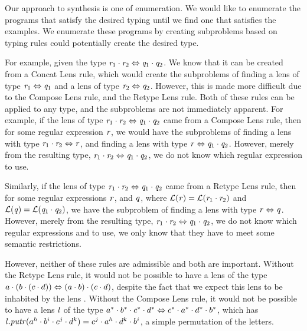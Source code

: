 Our approach to synthesis is one of enumeration.
We would like to enumerate the programs that satisfy the desired typing until
we find one that satisfies the examples.
We enumerate these programs by creating subproblems based on typing rules
could potentially create the desired type.

For example, given the type $\mathit{r}_1\cdot\mathit{r}_2\Leftrightarrow\mathit{q}_1\cdot\mathit{q}_2$.
We know that it can be created from a Concat Lens rule,
which would create the subproblems of finding a lens of type $\mathit{r}_1\Leftrightarrow\mathit{q}_1$
and a lens of type $\mathit{r}_2\Leftrightarrow\mathit{q}_2$.
However, this is made more difficult due to the Compose Lens rule,
and the Retype Lens rule.
Both of these rules can be applied to any type, and the subproblems are not immediately apparent.
For example, if the lens of type
$\mathit{r}_1\cdot\mathit{r}_2\Leftrightarrow\mathit{q}_1\cdot\mathit{q}_2$
came from a Compose Lens rule, then for some regular expression $\mathit{r}$,
we would have the subproblems of finding a lens with type
$\mathit{r}_1\cdot\mathit{r}_2\Leftrightarrow\mathit{r}$,
and finding a lens with type
$\mathit{r}\Leftrightarrow\mathit{q}_1\cdot\mathit{q}_2$.
However, merely from the resulting type,
$\mathit{r}_1\cdot\mathit{r}_2 \Leftrightarrow \mathit{q}_1\cdot\mathit{q}_2$,
we do not know which regular expression \Regex{} to use.

Similarly, if the lens of type
$\mathit{r}_1\cdot\mathit{r}_2\Leftrightarrow\mathit{q}_1\cdot\mathit{q}_2$
came from a Retype Lens rule, then for some regular expressions $\mathit{r}$, and $\mathit{q}$,
where $\mathcal{L}{}(\mathit{r})=\mathcal{L}{}(\mathit{r}_1\cdot\mathit{r}_2)$
and $\mathcal{L}{}(\mathit{q})=\mathcal{L}{}(\mathit{q}_1\cdot\mathit{q}_2)$,
we have the subproblem of finding a lens with type
$\mathit{r}\Leftrightarrow\mathit{q}$.
However, merely from the resulting type,
$\mathit{r}_1\cdot\mathit{r}_2\Leftrightarrow\mathit{q}_1\cdot\mathit{q}_2$,
we do not know which regular expressions \Regex{} and \RegexAlt{} to
use, we only know that they have to meet some semantic restrictions.

However, neither of these rules are admissible and both are important.
Without the Retype Lens rule, it would not be possible to have a lens of the type
$a\cdot (b\cdot (c\cdot d))\Leftrightarrow(a\cdot b)\cdot(c\cdot d)$,
despite the fact that we expect this lens to be inhabited by the lens \IdentityLens{}.
Without the Compose Lens rule, it would not be possible to have a lens $\mathit{l}$ of the type
$a^*\cdot b^*\cdot c^*\cdot d^* \Leftrightarrow
c^*\cdot a^*\cdot d^*\cdot b^*$,
which has $\mathit{l}.\mathit{putr}(a^h\cdot b^i \cdot c^j \cdot d^k)=c^j\cdot a^h\cdot d^k\cdot b^i$, a simple permutation of the letters.

